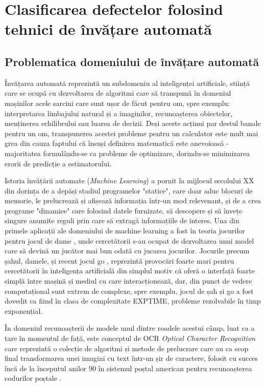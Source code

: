 \chapter{Clasificarea defectelor folosind tehnici de învățare automată}
\label{chap:ml_classification}


\section{Problematica domeniului de învățare automată}
Învățarea automată reprezintă un subdomeniu al inteligenței artificiale, stiință care se ocupă cu dezvoltarea de algoritmi care să transpună în domeniul mașinilor acele sarcini care sunt ușor de făcut pentru om, spre exemplu: interpretarea limbajului natural și a imaginilor, recunoașterea obiectelor, menținerea echilibrului sau luarea de decizii. Deși aceste acținui par destul banale pentru un om, transpunerea acestei probleme pentru un calculator este mult mai grea din cauza faptului că însuși definirea matematică este anevoioasă - majoritatea formulându-se ca probleme de optimizare, dorindu-se minimizarea erorii de predicție a estimatorului.

Istoria învățării automate (\textit{Machine Learning}) a pornit la mijlocul secolului XX din dorința de a depăși stadiul programelor "statice", care doar aduc blocuri de memorie, le prelucrează și afișează informația într-un mod relevenant, și de a crea programe "dinamice" care folosind datele furnizate, să descopere și să învețe singure anumite reguli prin care să extragă informațiile de interes. Una din primele aplicații ale domeniului de machine learning a fost în teoria jocurilor pentru jocul de  dame \cite{MLFirst}, unde cercetătorii s-au ocupat de dezvoltarea unui model care să devină un jucător mai bun odată cu jucarea jocurilor. Jocurile precum șahul, damele, și recent jocul go \cite{alphaGO}, reprezintă provocări foarte mari pentru cercetătorii în inteligența artificială din simplul motiv că oferă o interfață foarte simplă între mașină și mediul cu care interacționează, dar, din punct de vedere computațional sunt extrem de complexe, spre exemplu, jocul de șah și go a fost dovedit ca fiind în clasa de complexitate EXPTIME, probleme rezolvabile în timp exponențial.

În domeniul recunoașterii de modele unul dintre roadele acestui câmp, luat ca a tare în momentul de față, este conceptul de OCR \textit{Optical Character Recognition} care reprezintă o colecție de algoritmi și metode de prelucrare care au ca scop final transformarea unei imagini cu text într-un șir de caractere, folosit cu succes încă de la începutul anilor 90 în sistemul poștal american pentru recunoașterea codurilor poștale \cite{lecun1989backpropagation}.

